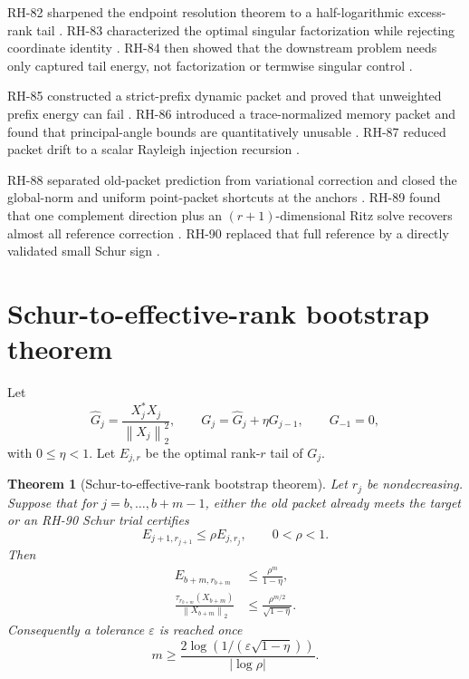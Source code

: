 \documentclass[11pt]{article}
\newtheorem{theorem}{Theorem}[section]
\theoremstyle{remark}
\newcommand{\norm}[1]{\left\lVert#1\right\rVert}
\begin{document}
RH-82 sharpened the endpoint resolution theorem to a half-logarithmic
excess-rank tail \citep{WangHalfLog2026}.  RH-83 characterized the optimal
singular factorization while rejecting coordinate identity
\citep{WangFactor2026}.  RH-84 then showed that the downstream problem needs
only captured tail energy, not factorization or termwise singular control
\citep{WangKyFan2026}.

RH-85 constructed a strict-prefix dynamic packet and proved that unweighted
prefix energy can fail \citep{WangSnapshot2026}.  RH-86 introduced a
trace-normalized memory packet and found that principal-angle bounds are
quantitatively unusable \citep{WangMemory2026}.  RH-87 reduced packet drift to
a scalar Rayleigh injection recursion \citep{WangInjection2026}.

RH-88 separated old-packet prediction from variational correction and closed
the global-norm and uniform point-packet shortcuts at the anchors
\citep{WangPredictor2026}.  RH-89 found that one complement direction plus an
$(r+1)$-dimensional Ritz solve recovers almost all reference correction
\citep{WangRitz2026}.  RH-90 replaced that full reference by a directly
validated small Schur sign \citep{WangSchur2026}.

\section{Schur-to-effective-rank bootstrap theorem}

Let
\[
 \widehat G_j=\frac{X_j^*X_j}{\norm{X_j}_2^2},\qquad
 G_j=\widehat G_j+\eta G_{j-1},\qquad G_{-1}=0,
\]
with $0\le\eta<1$.  Let $E_{j,r}$ be the optimal rank-$r$ tail of $G_j$.

\begin{theorem}[Schur-to-effective-rank bootstrap theorem]
\label{thm:bootstrap}
Let $r_j$ be nondecreasing.  Suppose that for $j=b,\ldots,b+m-1$, either the
old packet already meets the target or an RH-90 Schur trial certifies
\begin{equation}
 E_{j+1,r_{j+1}}\le\rho E_{j,r_j},\qquad0<\rho<1.
 \label{eq:contract}
\end{equation}
Then
\begin{align}
 E_{b+m,r_{b+m}}&\le\frac{\rho^m}{1-\eta},
 \label{eq:memory-tail}\\
 \frac{\tau_{r_{b+m}}(X_{b+m})}{\norm{X_{b+m}}_2}
 &\le\frac{\rho^{m/2}}{\sqrt{1-\eta}}.
 \label{eq:snapshot-tail}
\end{align}
Consequently a tolerance $\varepsilon$ is reached once
\[
 m\ge
 \frac{2\log(1/(\varepsilon\sqrt{1-\eta}))}{|\log\rho|}.
\]
\end{theorem}
\end{document}
